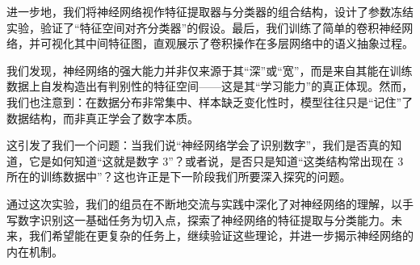 \documentclass[12pt,a4paper]{article}
\begin{document}
进一步地，我们将神经网络视作特征提取器与分类器的组合结构，设计了参数冻结实验，验证了“特征空间对齐分类器”的假设。最后，我们训练了简单的卷积神经网络，并可视化其中间特征图，直观展示了卷积操作在多层网络中的语义抽象过程。

我们发现，神经网络的强大能力并非仅来源于其“深”或“宽”，而是来自其能在训练数据上自发构造出有判别性的特征空间——这是其“学习能力”的真正体现。然而，我们也注意到：在数据分布非常集中、样本缺乏变化性时，模型往往只是“记住”了数据结构，而非真正学会了数字本质。

这引发了我们一个问题：当我们说“神经网络学会了识别数字”，我们是否真的知道，它是如何知道“这就是数字 3”？或者说，是否只是知道“这类结构常出现在 3 所在的训练数据中”？这也许正是下一阶段我们所要深入探究的问题。

通过这次实验，我们的组员在不断地交流与实践中深化了对神经网络的理解，以手写数字识别这一基础任务为切入点，探索了神经网络的特征提取与分类能力。未来，我们希望能在更复杂的任务上，继续验证这些理论，并进一步揭示神经网络的内在机制。

\newpage






\end{document}
